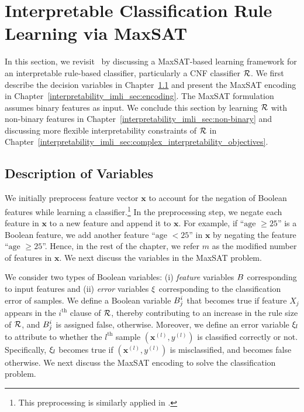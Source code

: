 \section{Interpretable Classification Rule Learning via MaxSAT}
\label{interpretability_imli_sec:baseline}
In this section, we revisit~\cite{malioutov2018mlic} by discussing a MaxSAT-based learning framework for an interpretable rule-based classifier, particularly a CNF classifier $ {\mathcal{R}} $. 
We first describe the decision variables in Chapter~\ref{interpretability_imli_sec:variables} and present the MaxSAT encoding  in Chapter~\ref{interpretability_imli_sec:encoding}. The MaxSAT formulation assumes binary features as input. We
conclude this section by learning $ {\mathcal{R}} $ with non-binary features in Chapter~\ref{interpretability_imli_sec:non-binary} and discussing more flexible interpretability constraints of $ {\mathcal{R}} $ in Chapter~\ref{interpretability_imli_sec:complex_interpretability_objectives}.  



\subsection{Description of Variables}
\label{interpretability_imli_sec:variables} 
We initially preprocess feature vector $ \mathbf{x} $  to account for the negation of  Boolean features while learning a classifier.\footnote{This preprocessing is similarly applied in  \cite{malioutov2013exact}.} In the preprocessing step, we negate each feature in $ \mathbf{x} $ to a new feature and append it to $ \mathbf{x} $. For example, if ``$ \text{age }\ge 25 $'' is a Boolean feature, we add another feature ``$ \text{age }< 25 $'' in  $ \mathbf{x} $ by negating the feature ``$ \text{age }\ge 25 $''. Hence, in the rest of the chapter, we refer $ m $ as the modified number of features in $ \mathbf{x} $. We next discuss the variables in the MaxSAT problem. 

We consider two types of Boolean variables: (i) \emph{feature} variables $ B $ corresponding to input features and (ii) \emph{error} variables $ \xi $ corresponding to the classification error of samples. We define a Boolean variable $ B^i_j $ that becomes true if feature $ X_j $ appears in the $ i^\text{th} $ clause of $ {\mathcal{R}} $, thereby contributing to an increase in the rule size of $ {\mathcal{R}} $, and $ B^i_j $ is assigned false, otherwise. Moreover, we define an error variable $ \xi_l $ to attribute to whether the $ l^\text{th} $ sample $ (\mathbf{x}^{(l)}, y^{(l)}) $ is classified correctly or not. Specifically, $ \xi_l $ becomes true if $ (\mathbf{x}^{(l)}, y^{(l)}) $ is misclassified, and becomes false otherwise.  We next discuss the MaxSAT encoding to solve the classification problem.   





